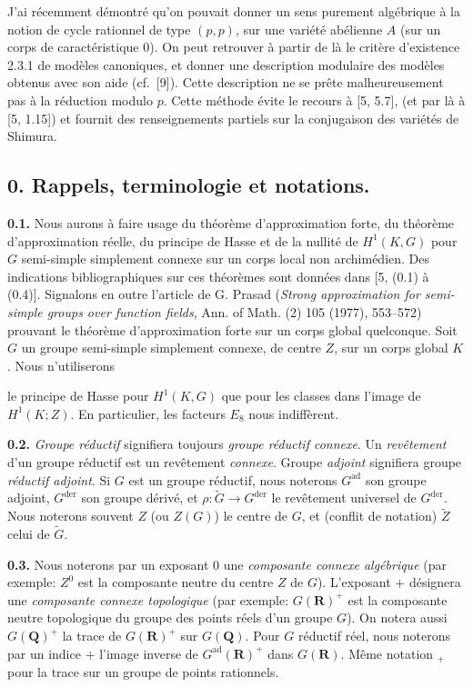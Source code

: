 \documentclass[10pt,a4paper]{article}
\newcommand{\SourcePage}[2]{\clearpage\setcounter{page}{#2}\typeout{D031_SOURCE_PAGE physical=#1 printed=#2}}
\begin{document}
J'ai récemment démontré qu'on pouvait donner un sens purement algébrique à la notion de cycle rationnel de type \((p,p)\), sur une variété abélienne \(A\) (sur un corps de caractéristique 0). On peut retrouver à partir de là le critère d'existence 2.3.1 de modèles canoniques, et donner une description modulaire des modèles obtenus avec son aide (cf.~{[}9{]}). Cette description ne se prête malheureusement pas à la réduction modulo \(p\). Cette méthode évite le recours à {[}5, 5.7{]}, (et par là à {[}5, 1.15{]}) et fournit des renseignements partiels sur la conjugaison des variétés de Shimura.

\subsection{0. Rappels, terminologie et notations.}

\textbf{0.1.} Nous aurons à faire usage du théorème d'approximation forte, du théorème d'approximation réelle, du principe de Hasse et de la nullité de \(H^1(K,G)\) pour \(G\) semi-simple simplement connexe sur un corps local non archimédien. Des indications bibliographiques sur ces théorèmes sont données dans {[}5, (0.1) à (0.4){]}. Signalons en outre l'article de G. Prasad (\emph{Strong approximation for semi-simple groups over function fields}, Ann. of Math. (2) 105 (1977), 553--572) prouvant le théorème d'approximation forte sur un corps global quelconque. Soit \(G\) un groupe semi-simple simplement connexe, de centre \(Z\), sur un corps global \(K\). Nous n'utiliserons

\SourcePage{5}{251}
le principe de Hasse pour \(H^1(K,G)\) que pour les classes dans l'image de \(H^1(K;Z)\). En particulier, les facteurs \(E_8\) nous indiffèrent.

\textbf{0.2.} \emph{Groupe réductif} signifiera toujours \emph{groupe réductif connexe}. Un \emph{revêtement} d'un groupe réductif est un revêtement \emph{connexe}. Groupe \emph{adjoint} signifiera groupe \emph{réductif adjoint}. Si \(G\) est un groupe réductif, nous noterons \(G^{\mathrm{ad}}\) son groupe adjoint, \(G^{\mathrm{der}}\) son groupe dérivé, et \(\rho:\widetilde G\to G^{\mathrm{der}}\) le revêtement universel de \(G^{\mathrm{der}}\). Nous noterons souvent \(Z\) (ou \(Z(G)\)) le centre de \(G\), et (conflit de notation) \(\widetilde Z\) celui de \(\widetilde G\).

\textbf{0.3.} Nous noterons par un exposant \(0\) une \emph{composante connexe algébrique} (par exemple: \(Z^0\) est la composante neutre du centre \(Z\) de \(G\)). L'exposant \(+\) désignera une \emph{composante connexe topologique} (par exemple: \(G(\mathbf R)^+\) est la composante neutre topologique du groupe des points réels d'un groupe \(G\)). On notera aussi \(G(\mathbf Q)^+\) la trace de \(G(\mathbf R)^+\) sur \(G(\mathbf Q)\). Pour \(G\) réductif réel, nous noterons par un indice \(+\) l'image inverse de \(G^{\mathrm{ad}}(\mathbf R)^+\) dans \(G(\mathbf R)\). Même notation \(_+\) pour la trace sur un groupe de points rationnels.
\end{document}
